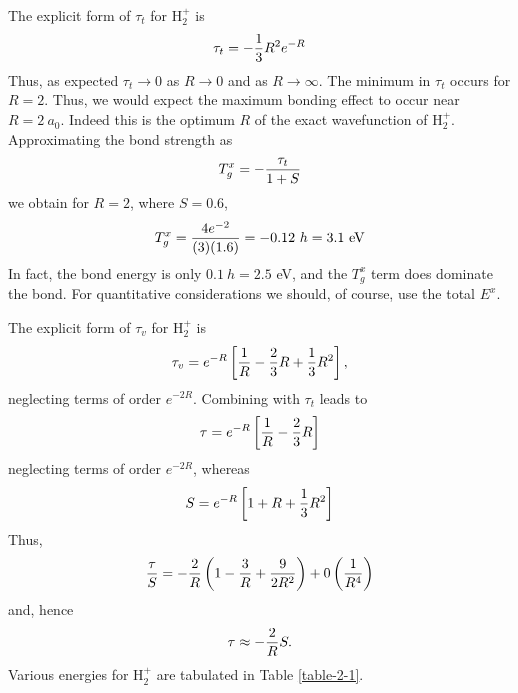 The explicit form of $\tau_t$ for H$^+_2$ is
\begin{equation}
\tau_t = - {1 \over 3} R^2 e^{-R}
\end{equation}
Thus, as expected $\tau_t \rightarrow 0$ as $R \rightarrow 0$ and as
$R \rightarrow \infty$. The minimum in $\tau_t$ occurs for $R =
2$. Thus, we would expect the maximum bonding effect to occur near $R
= 2\ a_0$.  Indeed this is the optimum $R$ of the exact wavefunction
of H$^+_2$. Approximating the bond strength as
\begin{equation}
T^x_g = - {\tau_t \over 1+S}
\end{equation}
we obtain for $R = 2$, where $S = 0.6$,
\begin{equation}
T^x_g = {4e^{-2} \over (3)(1.6)} = - 0.12\ h = 3.1\ \mathrm{eV}
\end{equation}
In fact, the bond energy is only $0.1\ h = 2.5$ eV, and the $T^x_g$ term 
does dominate the bond.  For quantitative considerations we should, of 
course, use the total $E^x$.

The explicit form of $\tau_v$ for H$^+_2$ is
\begin{equation}
\tau_v = e^{-R} \left[ {1 \over R} - {2 \over 3} R + {1 \over 3} R^2 
\right] ,
\end{equation}
neglecting terms of order $e^{-2R}$. Combining with $\tau_t$ leads to
\begin{equation}
\tau = e^{-R} \left[ {1 \over R} - {2 \over 3} R \right]
\end{equation}
neglecting terms of order $e^{-2R}$, whereas
\begin{equation}
S =  e^{-R} \left[ 1 + R + {1 \over 3} R^2 \right]
\end{equation}
Thus,
\begin{equation}
{\tau \over S} = - {2 \over R} \left( 1 - {3 \over R} + {9 \over 
2R^2} \right) + 0 \left( {1 \over R^4} \right)
\end{equation}
and, hence
\begin{equation}
\tau \approx - {2 \over R} S .
\end{equation}
Various energies for H$^+_2$ are tabulated in Table \ref{table-2-1}.

